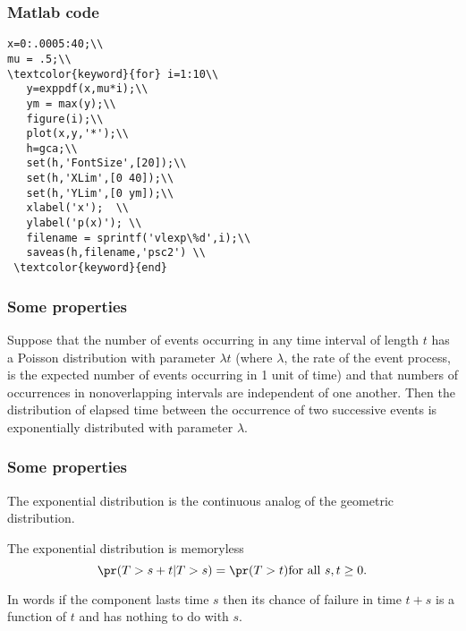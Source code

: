 \begin{frame}[fragile]\frametitle{Matlab code}

{\tiny

\begin{lstlisting}
x=0:.0005:40;\\
mu = .5;\\
\textcolor{keyword}{for} i=1:10\\
   y=exppdf(x,mu*i);\\
   ym = max(y);\\
   figure(i);\\
   plot(x,y,'*');\\
   h=gca;\\
   set(h,'FontSize',[20]);\\
   set(h,'XLim',[0 40]);\\
   set(h,'YLim',[0 ym]);\\
   xlabel('x');  \\
   ylabel('p(x)'); \\
   filename = sprintf('vlexp\%d',i);\\
   saveas(h,filename,'psc2') \\
 \textcolor{keyword}{end}
\end{lstlisting}
}
\end{frame}


\begin{frame}[fragile]\frametitle{Some properties}

\begin{prop}

Suppose that the number of events occurring in any time interval of length $t$ has a Poisson distribution with parameter $\lambda t$ (where $\lambda$, the rate of the event process, is the expected number of events occurring in 1 unit of time) and that numbers of occurrences in nonoverlapping intervals are independent of one another. Then the distribution of elapsed time between the occurrence of two successive events is exponentially distributed with parameter $\lambda$.

\end{prop}

\end{frame}

\begin{frame}[fragile]\frametitle{Some properties}

\begin{prop}
The exponential distribution is the continuous
analog of the geometric distribution. 
\end{prop} 


\begin{prop}
The exponential distribution is memoryless
$$\pr(T > s + t | T > s) = \pr(T > t) \hbox{for all}\ s, t \ge 0.$$  

In words if the component lasts time $s$ then its chance of failure
in time $t+s$ is a function of $t$ and has nothing to do with $s$.  
\end{prop}
\end{frame}


